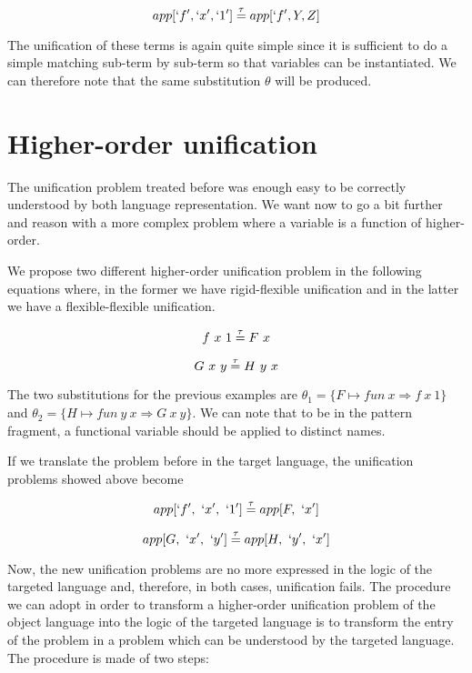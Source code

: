 \documentclass{rapport}
\begin{document}
\begin{equation}
  app[`f', `x', `1'] \mathrel{\overset{\mathrm{\tau}}{=}} app[`f', Y, Z]
  \label{eq:unif-fo-elpi}
\end{equation}

The unification of these terms is again quite simple since it is sufficient to
do a simple matching sub-term by sub-term so that variables can be instantiated.
We can therefore note that the same substitution $\theta$ will be produced.

\section{Higher-order unification}

The unification problem treated before was enough easy to be correctly
understood by both language representation. We want now to go a bit further and
reason with a more complex problem where a variable is a function of
higher-order. 

We propose two different higher-order unification problem in the following
equations where, in the former we have rigid-flexible unification and in the
latter we have a flexible-flexible unification.

\begin{equation}
  f\ x\ 1 \mathrel{\overset{\mathrm{\tau}}{=}} F\ x
  \label{eq:unif-ho-coq1}
\end{equation}

\begin{equation}
  G\ x\ y \mathrel{\overset{\mathrm{\tau}}{=}} H\ y\ x
  \label{eq:unif-ho-coq2}
\end{equation}

The two substitutions for the previous examples are $\theta_1 = \{F \mapsto fun\
x \Rightarrow f\ x\ 1\}$ and $\theta_2 = \{H \mapsto fun\ y\ x \Rightarrow G\ x\
y\}$. We can note that to be in the pattern fragment, a functional variable
should be applied to distinct names.

If we translate the problem before in the target language, the unification
problems showed above become

\begin{equation}
  app[`f',\ `x',\ `1'] \mathrel{\overset{\mathrm{\tau}}{=}} app[F,\ `x']
  \label{eq:unif-ho-elpi1}
\end{equation}

\begin{equation}
  app[G,\ `x',\ `y'] \eqtau app[H,\ `y',\ `x']
  \label{eq:unif-ho-elpi2}
\end{equation}

Now, the new unification problems are no more expressed in the logic of the
targeted language and, therefore, in both cases, unification fails. The
procedure we can adopt in order to transform a higher-order unification problem
of the object language into the logic of the targeted language is to transform
the entry of the problem in a problem which can be understood by the targeted
language. The procedure is made of two steps:
\end{document}
